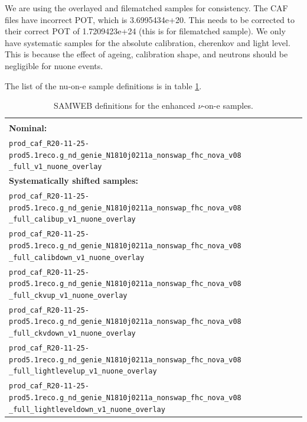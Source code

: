 We are using the overlayed and filematched samples for consistency. The CAF files have incorrect \gls{POT}, which is 3.6995434e+20. This needs to be corrected to their correct \gls{POT} of 1.7209423e+24 (this is for filematched sample). We only have systematic samples for the absolute calibration, cherenkov and light level. This is because the effect of ageing, calibration shape, and neutrons should be negligible for \gls{nuone} events.

The list of the nu-on-e sample definitions is in table \ref{tab:NuoneDefinitions}.

\begin{table}[!ht]
\centering
\caption{SAMWEB definitions for the enhanced $\nu$-on-e samples.}
\begin{tabular}{p{\textwidth}}
\hline\hline\\[-2mm]
\textbf{Nominal:}\\
\texttt{prod\_caf\_R20-11-25-prod5.1reco.g\_nd\_genie\_N1810j0211a\_nonswap\_fhc\_nova\_v08} \texttt{\_full\_v1\_nuone\_overlay}\\[7mm]
\textbf{Systematically shifted samples:}\\
\texttt{prod\_caf\_R20-11-25-prod5.1reco.g\_nd\_genie\_N1810j0211a\_nonswap\_fhc\_nova\_v08} \texttt{\_full\_calibup\_v1\_nuone\_overlay}\\[7mm]
\texttt{prod\_caf\_R20-11-25-prod5.1reco.g\_nd\_genie\_N1810j0211a\_nonswap\_fhc\_nova\_v08} \texttt{\_full\_calibdown\_v1\_nuone\_overlay}\\[7mm]
\texttt{prod\_caf\_R20-11-25-prod5.1reco.g\_nd\_genie\_N1810j0211a\_nonswap\_fhc\_nova\_v08} \texttt{\_full\_ckvup\_v1\_nuone\_overlay}\\[7mm]
\texttt{prod\_caf\_R20-11-25-prod5.1reco.g\_nd\_genie\_N1810j0211a\_nonswap\_fhc\_nova\_v08} \texttt{\_full\_ckvdown\_v1\_nuone\_overlay}\\[7mm]
\texttt{prod\_caf\_R20-11-25-prod5.1reco.g\_nd\_genie\_N1810j0211a\_nonswap\_fhc\_nova\_v08} \texttt{\_full\_lightlevelup\_v1\_nuone\_overlay}\\[7mm]
\texttt{prod\_caf\_R20-11-25-prod5.1reco.g\_nd\_genie\_N1810j0211a\_nonswap\_fhc\_nova\_v08} \texttt{\_full\_lightleveldown\_v1\_nuone\_overlay}\\[7mm]
\hline\hline
\end{tabular}
\label{tab:NuoneDefinitions}
\end{table}


